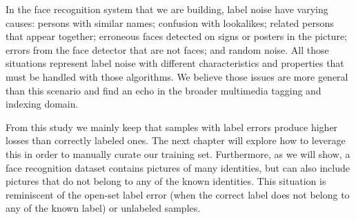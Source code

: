 In the face recognition system that we are building, label noise have varying causes: persons with similar names; confusion with lookalikes; related persons that appear together; erroneous faces detected on signs or posters in the picture; errors from the face detector that are not faces; and random noise. All those situations represent label noise with different characteristics and properties that must be handled with those algorithms. We believe those issues are more general than this scenario and find an echo in the broader multimedia tagging and indexing domain.

From this study we mainly keep that samples with label errors produce higher losses than correctly labeled ones. The next chapter will explore how to leverage this in order to manually curate our training set. Furthermore, as we will show, a face recognition dataset contains pictures of many identities, but can also include pictures that do not belong to any of the known identities. This situation is reminiscent of the open-set label error (when the correct label does not belong to any of the known label) or unlabeled samples.
